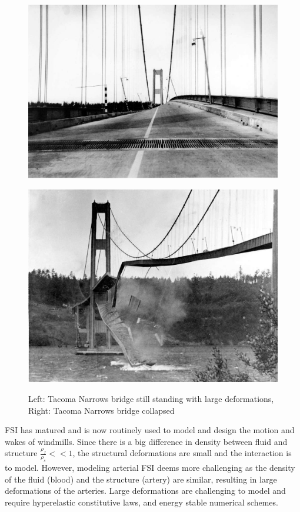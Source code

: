 \begin{figure}
\centering
\begin{minipage}{.50\textwidth}
  \centering
  \includegraphics[width=.95\linewidth]{./IntroductionToFSI/tacoma2.jpeg}
  \label{fig:test1}
\end{minipage}%
\begin{minipage}{.50\textwidth}
  \centering
  \includegraphics[width=.86\linewidth]{./IntroductionToFSI/tacoma3.jpeg}
  \label{fig:test2}
\end{minipage}
  \caption{Left: Tacoma Narrows bridge still standing with large deformations, Right: Tacoma Narrows bridge collapsed}
  \label{tacoma}
\end{figure}

FSI has matured and is now routinely used to model and design the motion and wakes of windmills.
Since there is a big difference in density between fluid and structure $\frac{\rho_f}{\rho_s} << 1$, the structural deformations are small and the interaction is  to model. However, modeling arterial FSI deems more challenging as the density of the fluid (blood) and the structure (artery) are similar, resulting in large deformations of the arteries. Large deformations are challenging to model and require hyperelastic constitutive laws, and energy stable numerical schemes.\newline

